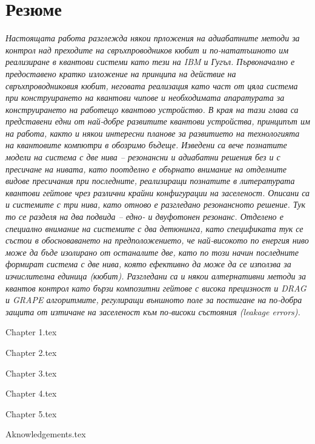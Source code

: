 \documentclass[12pt]{report}
\begin{document}
        \chapter*{Резюме}
    \small \textit{Настоящата работа разглежда някои прложения на адиабатните методи за контрол над преходите на свръхпроводников кюбит
    и по-нататъшното им реализиране в квантови системи като тези на IBM и Гугъл. Първоначално е предоставено кратко изложение на принципа
    на действие на свръхпроводниковия кюбит, неговата реализация като част от цяла система при конструирането на квантови чипове и необходимата
    апаратурата за конструирането на работещо квантово устройство. В края на тази глава са представени едни от най-добре развитите квантови устройства,
    принципът им на работа, както и някои интересни планове за развитието на технологията на квантовите компютри в обозримо бъдеще. Изведени са вече
    познатите модели на система с две нива -- резонансни и адиабатни решения без и с пресичане на нивата, като поотделно е обърнато внимание на отделните
    видове пресичания при последните, реализиращи познатите в литературата квантови гейтове чрез различни крайни конфигурации на заселеност. Описани са и
    системите с три нива, като отново е разгледано резонансното решение. Тук то се разделя на два подвида -- едно- и двуфотонен резонанс. Отделено
    е специално внимание на системите с два детюнинга, като спецификата тук се състои в обосноваването на предположението, че най-високото по енергия ниво може
    да бъде изолирано от останалите две, като по този начин последните формират система с две нива, която ефективно да може да се използва за изчислителна единица
    (кюбит). Разгледани са и някои алтернативни методи за квантов контрол като бързи композитни гейтове с висока прецизност и DRAG и GRAPE алгоритмите,
    регулиращи външното поле за постигане на по-добра защита от изтичане на заселеност към по-високи състояния (leakage errors).}\vspace{10mm}

    {Chapter 1.tex}

    {Chapter 2.tex}

    {Chapter 3.tex}

    {Chapter 4.tex}

    {Chapter 5.tex}
    
    {Aknowledgements.tex}

            \newpage
            \thispagestyle{empty}
            
            
\end{document}
